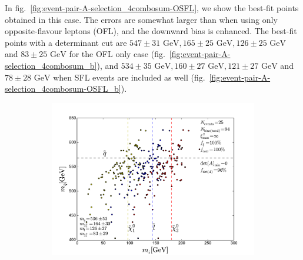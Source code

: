 \documentclass[twoside,english]{uiofysmaster}
\begin{document}
In fig.\ \ref{fig:event-pair-A-selection_4combosum-OSFL}, we show the best-fit points obtained in this case. The errors are somewhat larger than when using only opposite-flavour leptons (OFL), and the downward bias is enhanced. The best-fit points with a determinant cut are $547 \pm 31\,\, \mathrm{GeV}, 165 \pm 25\,\, \mathrm{GeV}, 126 \pm 25\,\, \mathrm{GeV}$ and $83 \pm 25\,\, \mathrm{GeV}$ for the OFL only case (fig.\ \ref{fig:event-pair-A-selection_4combosum_b}), and $534 \pm 35\,\, \mathrm{GeV}, 160 \pm 27\,\, \mathrm{GeV}, 121 \pm 27\,\, \mathrm{GeV}$ and $78 \pm 28\,\, \mathrm{GeV}$ when SFL events are included as well (fig.\ \ref{fig:event-pair-A-selection_4combosum-OSFL_b}).
\begin{figure}[hbt]
	\centering
	\begin{subfigure}[b]{0.6\textwidth}
		\includegraphics[width=\textwidth]{figures/improving_combinatorics/herwigpp-OSFL_nosmear_nodetAcut_A_matrix_algorithm_4combosum_TMP.pdf} 
		\caption{ }
		\label{fig:event-pair-A-selection_4combosum-OSFL_a}
	\end{subfigure}


\end{figure}
\end{document}

